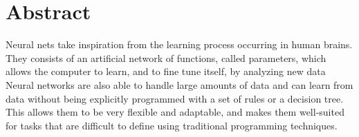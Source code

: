 \section*{Abstract}
Neural nets take inspiration from the learning process occurring in human brains. They consists of an artificial network of functions, called parameters, which allows the computer to learn, and to fine tune itself, by analyzing new data
\\
Neural networks are also able to handle large amounts of data and can learn from data without being explicitly programmed with a set of rules or a decision tree. This allows them to be very flexible and adaptable, and makes them well-suited for tasks that are difficult to define using traditional programming techniques.
\vspace{.5cm}
\\

\newpage